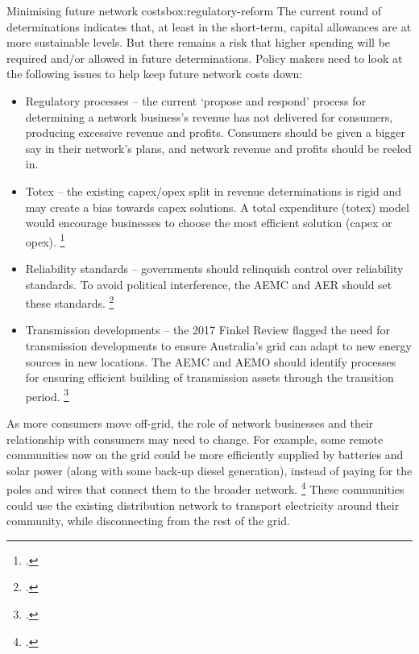 \documentclass[FrontPage]{grattan}
\begin{document}
\begin{smallbox}{Minimising future network costs}{box:regulatory-reform}
The current round of determinations indicates that, at least in the short-term, capital allowances are at more sustainable levels. But there remains a risk that higher spending will be required and/or allowed in future determinations. Policy makers need to look at the following issues to help keep future network costs down:

\begin{itemize}
 \item Regulatory processes -- the current `propose and respond' process for determining a network business's revenue has not delivered for consumers, producing excessive revenue and profits. Consumers should be given a bigger say in their network's plans, and network revenue and profits should be reeled in.
 \item Totex -- the existing capex/opex split in revenue determinations is rigid and may create a bias towards capex solutions. A total expenditure (totex) model would encourage businesses to choose the most efficient solution (capex or opex).%
 \footcite{AEMC2018NetworkFrameworkReview}
 \item Reliability standards -- governments should relinquish control over reliability standards. To avoid political interference, the AEMC and AER should set these standards.%
 \footcite{WoodHunterOTooleEtAl2012}
 \item Transmission developments -- the 2017 Finkel Review flagged the need for transmission developments to ensure Australia's grid can adapt to new energy sources in new locations. The AEMC and AEMO should identify processes for ensuring efficient building of transmission assets through the transition period.%
 \footcites{AEMO2017IntegratedSystemPlanConsultation}{AEMC2017CoordinateTransmissionGenerationInvestment}
\end{itemize}

\end{smallbox}


As more consumers move off-grid, the role of network businesses and their relationship with consumers may need to change. For example, some remote communities now on the grid could be more efficiently supplied by batteries and solar power (along with some back-up diesel generation), instead of paying for the poles and wires that connect them to the broader network.%
\footcite{WoodBlowers-2015-Sundown-sunrise}
These communities could use the existing distribution network to transport electricity around their community, while disconnecting from the rest of the grid.
\end{document}
